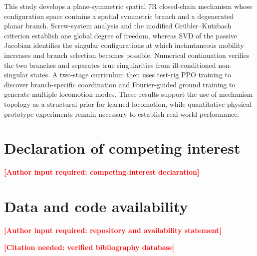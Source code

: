 ﻿\documentclass[a4paper,fleqn]{cas-sc}
\newcommand{\missing}[1]{\textcolor{red}{\textbf{[#1]}}}
\begin{document}
This study develops a plane-symmetric spatial 7R closed-chain mechanism whose
configuration space contains a spatial symmetric branch and a degenerated
planar branch. Screw-system analysis and the modified
Gr\"ubler--Kutzbach criterion establish one global degree of freedom, whereas
SVD of the passive Jacobian identifies the singular configurations at which
instantaneous mobility increases and branch selection becomes possible.
Numerical continuation verifies the two branches and separates true
singularities from ill-conditioned non-singular states. A two-stage
curriculum then uses test-rig PPO training to discover branch-specific
coordination and Fourier-guided ground training to generate multiple
locomotion modes. These results support the use of mechanism topology as a
structural prior for learned locomotion, while quantitative physical
prototype experiments remain necessary to establish real-world performance.

\section*{Declaration of competing interest}
\missing{Author input required: competing-interest declaration}

\section*{Data and code availability}
\missing{Author input required: repository and availability statement}

% 
% 
\missing{Citation needed: verified bibliography database}
\end{document}
